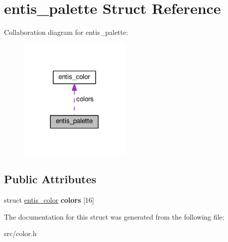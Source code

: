 \hypertarget{structentis__palette}{}\section{entis\+\_\+palette Struct Reference}
\label{structentis__palette}


Collaboration diagram for entis\+\_\+palette\+:\nopagebreak
\begin{figure}[H]
\begin{center}
\leavevmode
\includegraphics[width=152pt]{structentis__palette__coll__graph}
\end{center}
\end{figure}
\subsection*{Public Attributes}
\begin{DoxyCompactItemize}
\item 
\mbox{\label{structentis__palette_a310189bf8fa2fd86b15cdd451a796588}} 
struct \hyperlink{structentis__color}{entis\+\_\+color} {\bfseries colors} \mbox{[}16\mbox{]}
\end{DoxyCompactItemize}


The documentation for this struct was generated from the following file\+:\begin{DoxyCompactItemize}
\item 
src/color.\+h\end{DoxyCompactItemize}
